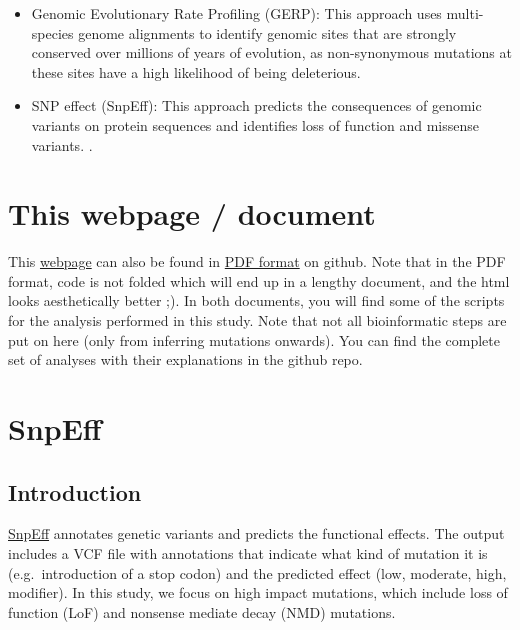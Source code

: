 \documentclass[
  letterpaper,
  DIV=11,
  numbers=noendperiod]{scrreprt}
\begin{document}
\begin{itemize}
\item
  Genomic Evolutionary Rate Profiling (GERP): This approach uses
  multi-species genome alignments to identify genomic sites that are
  strongly conserved over millions of years of evolution, as
  non-synonymous mutations at these sites have a high likelihood of
  being deleterious. \autocite{davydovIdentifyingHighFraction2010}
\item
  SNP effect (SnpEff): This approach predicts the consequences of
  genomic variants on protein sequences and identifies loss of function
  and missense variants. \autocite{cingolani2012}.
\end{itemize}


\chapter{This webpage / document}\label{this-webpage-document}

This \href{https://rshuhuachen.github.io/ms_load_grouse/}{webpage} can
also be found in
\href{https://github.com/rshuhuachen/ms_load_grouse/docs/Mutation-Load-in-Black-Grouse.pdf}{PDF
format} on github. Note that in the PDF format, code is not folded which
will end up in a lengthy document, and the html looks aesthetically
better ;). In both documents, you will find some of the scripts for the
analysis performed in this study. Note that not all bioinformatic steps
are put on here (only from inferring mutations onwards). You can find
the complete set of analyses with their explanations in the github repo.


\chapter{SnpEff}\label{snpeff}

\section{Introduction}\label{introduction-1}

\href{https://pcingola.github.io/SnpEff/}{SnpEff} annotates genetic
variants and predicts the functional effects. The output includes a VCF
file with annotations that indicate what kind of mutation it is
(e.g.~introduction of a stop codon) and the predicted effect (low,
moderate, high, modifier). In this study, we focus on high impact
mutations, which include loss of function (LoF) and nonsense mediate
decay (NMD) mutations.
\end{document}
